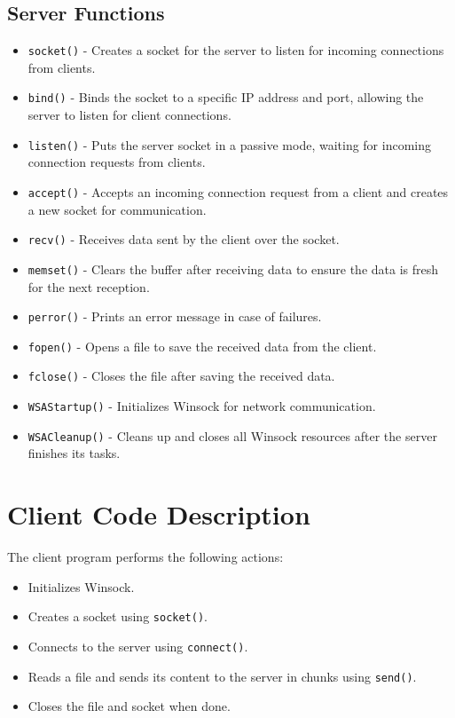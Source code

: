 \documentclass[a4paper,12pt]{article}
\begin{document}
\subsection{Server Functions}

\begin{itemize}
    \item \texttt{socket()} - Creates a socket for the server to listen for incoming connections from clients.
    \item \texttt{bind()} - Binds the socket to a specific IP address and port, allowing the server to listen for client connections.
    \item \texttt{listen()} - Puts the server socket in a passive mode, waiting for incoming connection requests from clients.
    \item \texttt{accept()} - Accepts an incoming connection request from a client and creates a new socket for communication.
    \item \texttt{recv()} - Receives data sent by the client over the socket.
    \item \texttt{memset()} - Clears the buffer after receiving data to ensure the data is fresh for the next reception.
    \item \texttt{perror()} - Prints an error message in case of failures.
    \item \texttt{fopen()} - Opens a file to save the received data from the client.
    \item \texttt{fclose()} - Closes the file after saving the received data.
    \item \texttt{WSAStartup()} - Initializes Winsock for network communication.
    \item \texttt{WSACleanup()} - Cleans up and closes all Winsock resources after the server finishes its tasks.
\end{itemize}

\section{Client Code Description}
The client program performs the following actions:
\begin{itemize}
    \item Initializes Winsock.
    \item Creates a socket using \texttt{socket()}.
    \item Connects to the server using \texttt{connect()}.
    \item Reads a file and sends its content to the server in chunks using \texttt{send()}.
    \item Closes the file and socket when done.
\end{itemize}
\end{document}
